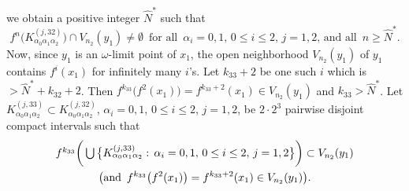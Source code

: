 \documentclass[12pt]{article}
\newcommand{\al}{\alpha}
\begin{document}
we obtain a positive integer $\widehat N^*$ such that 
$$
f^n\big(K_{\al_0\al_1\al_2}^{(j,32)}\big) \cap V_{n_2}(y_1) \ne \emptyset \,\,\, \text{for all} \,\,\, \al_i = 0, 1, \, 0 \le i \le 2, \, j = 1, 2, \, \text{and all} \,\,\, n \ge \widehat N^*.
$$
\indent Now, since $y_1$ is an $\omega$-limit point of $x_1$, the open neighborhood $V_{n_2}(y_1)$ of $y_1$ contains $f^i(x_1)$ for infinitely many $i$'s.  Let $k_{33}+2$ be one such $i$ which is $> \widehat N^*+k_{32}+2$.  Then $f^{k_{33}}\big(f^2(x_1)\big) = f^{k_{33}+2}(x_1) \in V_{n_2}(y_1)$ and $k_{33} > \widehat N^*$.  Let $K_{\al_0\al_1\al_2}^{(j,33)} \subset K_{\al_0\al_1\al_2}^{(j,32)}$, $\al_i = 0, 1$, $0 \le i \le 2$, $j = 1, 2$, be $2 \cdot 2^3$ pairwise disjoint compact intervals such that 
\begin{multline*}
$$
f^{k_{33}}\bigg(\bigcup \big\{ K_{\al_0\al_1\al_2}^{(j,33)}: \, \al_i = 0, 1, \, 0 \le i \le 2, \, j = 1, 2 \big\}\bigg) \subset V_{n_2}(y_1) \\ \big(\text{and} \,\,\, f^{k_{33}}\big(f^2(x_1)\big) = f^{k_{33}+2}(x_1) \in V_{n_2}(y_1)\big).
$$
\end{multline*}
\end{document}
